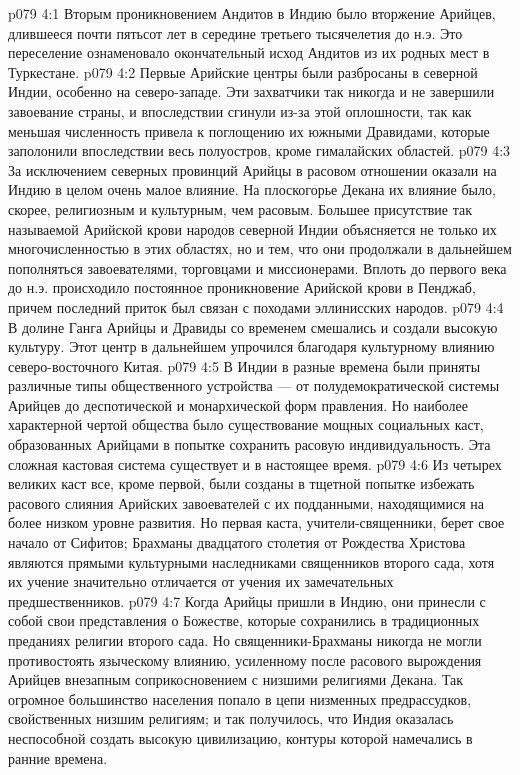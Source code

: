 \vs p079 4:1 Вторым проникновением Андитов в Индию было вторжение Арийцев, длившееся почти пятьсот лет в середине третьего тысячелетия до н.э. Это переселение ознаменовало окончательный исход Андитов из их родных мест в Туркестане.
\vs p079 4:2 Первые Арийские центры были разбросаны в северной Индии, особенно на северо\hyp{}западе. Эти захватчики так никогда и не завершили завоевание страны, и впоследствии сгинули из\hyp{}за этой оплошности, так как меньшая численность привела к поглощению их южными Дравидами, которые заполонили впоследствии весь полуостров, кроме гималайских областей.
\vs p079 4:3 За исключением северных провинций Арийцы в расовом отношении оказали на Индию в целом очень малое влияние. На плоскогорье Декана их влияние было, скорее, религиозным и культурным, чем расовым. Большее присутствие так называемой Арийской крови народов северной Индии объясняется не только их многочисленностью в этих областях, но и тем, что они продолжали в дальнейшем пополняться завоевателями, торговцами и миссионерами. Вплоть до первого века до н.э. происходило постоянное проникновение Арийской крови в Пенджаб, причем последний приток был связан с походами эллинисских народов.
\vs p079 4:4 В долине Ганга Арийцы и Дравиды со временем смешались и создали высокую культуру. Этот центр в дальнейшем упрочился благодаря культурному влиянию северо\hyp{}восточного Китая.
\vs p079 4:5 В Индии в разные времена были приняты различные типы общественного устройства --- от полудемократической системы Арийцев до деспотической и монархической форм правления. Но наиболее характерной чертой общества было существование мощных социальных каст, образованных Арийцами в попытке сохранить расовую индивидуальность. Эта сложная кастовая система существует и в настоящее время.
\vs p079 4:6 Из четырех великих каст все, кроме первой, были созданы в тщетной попытке избежать расового слияния Арийских завоевателей с их подданными, находящимися на более низком уровне развития. Но первая каста, учители\hyp{}священники, берет свое начало от Сифитов; Брахманы двадцатого столетия от Рождества Христова являются прямыми культурными наследниками священников второго сада, хотя их учение значительно отличается от учения их замечательных предшественников.
\vs p079 4:7 Когда Арийцы пришли в Индию, они принесли с собой свои представления о Божестве, которые сохранились в традиционных преданиях религии второго сада. Но священники\hyp{}Брахманы никогда не могли противостоять языческому влиянию, усиленному после расового вырождения Арийцев внезапным соприкосновением с низшими религиями Декана. Так огромное большинство населения попало в цепи низменных предрассудков, свойственных низшим религиям; и так получилось, что Индия оказалась неспособной создать высокую цивилизацию, контуры которой намечались в ранние времена.
